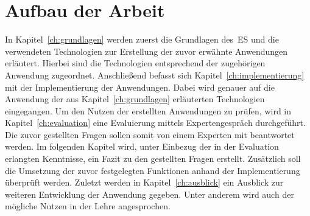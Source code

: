 \section{Aufbau der Arbeit}\label{sec:aufbau-der-arbeit}
In Kapitel~\ref{ch:grundlagen} werden zuerst die Grundlagen des~\ac{ES} und die verwendeten Technologien
zur Erstellung der zuvor erwähnte Anwendungen erläutert.
Hierbei sind die Technologien entsprechend der zugehörigen Anwendung zugeordnet.
Anschließend befasst sich Kapitel~\ref{ch:implementierung} mit der Implementierung der Anwendungen.
Dabei wird genauer auf die Anwendung der aus Kapitel~\ref{ch:grundlagen} erläuterten Technologien eingegangen.
Um den Nutzen der erstellten Anwendungen zu prüfen, wird in Kapitel~\ref{ch:evaluation} eine Evaluierung mittels Expertengespräch durchgeführt.
Die zuvor gestellten Fragen sollen somit von einem Experten mit beantwortet werden.
Im folgenden Kapitel wird, unter Einbezug der in der Evaluation erlangten Kenntnisse, ein Fazit zu den gestellten Fragen erstellt.
Zusätzlich soll die Umsetzung der zuvor festgelegten Funktionen anhand der Implementierung überprüft werden.
Zuletzt werden in Kapitel~\ref{ch:ausblick} ein Ausblick zur weiteren Entwicklung der Anwendung gegeben.
Unter anderem wird auch der mögliche Nutzen in der Lehre angesprochen.

